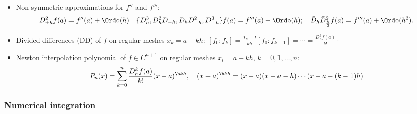 \documentclass[a4paper]{article}
\begin{document}
\begin{itemize}
  \item Non-symmetric approximations for $f''$ and $f'''$:
    \[
      D_{\pm h}^2f(a) = f''(a) + \Ordo(h)
      \quad
     \{
       D_h^3,
       D_h^2D_{-h},
       D_hD_{-h}^2,
       D_{-h}^3
     \}f(a)
     =
     f'''(a) + \Ordo(h);
     \quad
       \bar D_{h}\bar D_{\frac h2}^2 f(a)
     =
     f'''(a) + \Ordo(h^2).
    \]

  \item Divided differences (DD)
    of $f$ on regular meshes $x_k=a+kh$:
    $
    [f_0\!:\!f_k]
    =
     \frac{T_h-I}{kh}[f_0\!:\!f_{k-1}]
     = \cdots
     =\frac{D_h^kf(a)}{k!}
     \cdot
    $

  \item Newton interpolation polynomial
    of $f\in C^{n+1}$ on regular meshes $x_i=a+kh$,
    $k=0,1,\ldots,n$:
    \[
      P_n(x)
      = \sum_{k=0}^n
         \frac{D_h^kf(a)}{k!}
        (x-a)^{\scriptsize\b kh},
        \quad
        (x-a)^{\scriptsize\b kh}
         = (x-a)(x-a-h)\cdots(x-a-(k-1)h)
    \]

\end{itemize}%

\subsubsection*{Numerical integration}%
\end{document}
